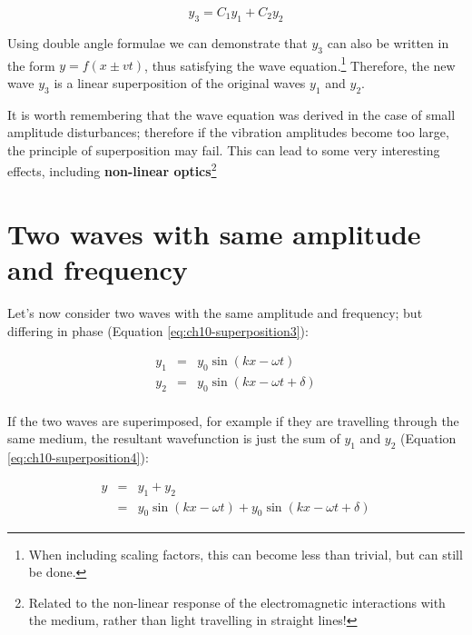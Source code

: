 \documentclass[
]{book}
\begin{document}
\begin{equation}
y_3 = C_1 y_1 + C_2 y_2
\label{eq:ch10-superposition2}
\end{equation}

Using double angle formulae we can demonstrate that \(y_3\) can also be written in the form \(y = f(x \pm vt)\), thus satisfying the wave equation.\footnote{When including scaling factors, this can become less than trivial, but can still be done.} Therefore, the new wave \(y_3\) is a linear superposition of the original waves \(y_1\) and \(y_2\).

It is worth remembering that the wave equation was derived in the case of small amplitude disturbances; therefore if the vibration amplitudes become too large, the principle of superposition may fail. This can lead to some very interesting effects, including \textbf{non-linear optics}\footnote{Related to the non-linear response of the electromagnetic interactions with the medium, rather than light travelling in straight lines!}

\hypertarget{sec-ch10-identicalwaves1}{%
\section{Two waves with same amplitude and frequency}\label{sec-ch10-identicalwaves1}}

Let's now consider two waves with the same amplitude and frequency; but differing in phase (Equation \eqref{eq:ch10-superposition3}):

\begin{equation}
\begin{array}{rcl}
y_1 &=& y_0 \sin (kx - \omega t) \\
y_2 &=& y_0 \sin (kx - \omega t +\delta ) \\
\end{array}
\label{eq:ch10-superposition3}
\end{equation}

If the two waves are superimposed, for example if they are travelling through the same medium, the resultant wavefunction is just the sum of \(y_1\) and \(y_2\) (Equation \eqref{eq:ch10-superposition4}):

\begin{equation}
\begin{array}{rcl}
y &=& y_1 + y_2 \\
  &=& y_0 \sin (kx - \omega t) + y_0 \sin (kx - \omega t +\delta )
\end{array}
\label{eq:ch10-superposition4}
\end{equation}
\end{document}
